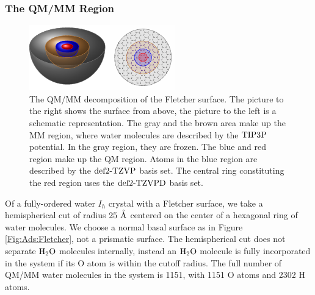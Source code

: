 \documentclass[8.5pt,twoside,twocolumn]{article}
\renewcommand{\Ang}{\mathring{\te{A}}}
\theoremstyle{standard}
\begin{document}
\subsubsection{The QM/MM Region}
\label{Sec:Ads:QM/MM}

\begin{figure}[ht]
\centering
\includegraphics[width=\textwidth]{TikzPics/TikzCreation/SurfaceQMMM/SurfaceQMMMAside.pdf}
\newline
\caption{The QM/MM decomposition of the Fletcher surface. The picture to the right shows the surface from above,
the picture to the left is a schematic representation. The gray and the brown area make up the MM region,
where water molecules are described by the $\text{TIP3P}$ potential. In the gray region, they are frozen. 
The blue and red region make up the QM region. Atoms in the blue region are described by the
$\text{def2-TZVP}$ basis set. The central ring constituting the red region uses the $\text{def2-TZVPD}$ basis set.}
\label{Fig:Ads:QMMM}
\end{figure}

Of a fully-ordered water $I_h$ crystal with a Fletcher surface, we take
a hemispherical cut of radius $25~\Ang$ centered on the center of a hexagonal
ring of water molecules. We choose a normal basal surface as in
Figure \ref{Fig:Ads:Fletcher}, not a prismatic surface. The hemispherical
cut does not separate $\text H _2 \text O$ molecules internally, instead an $\text H _2 \text O$ molecule
is fully incorporated in the system if its O atom is within the cutoff
radius. The full number of QM/MM water molecules in the system is
1151, with 1151 O atoms and 2302 H atoms.
\end{document}
